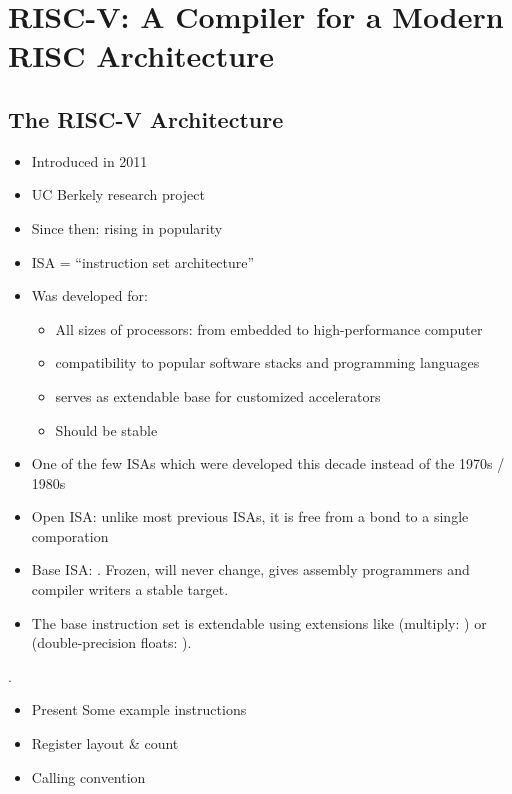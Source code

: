\section{RISC-V: A Compiler for a Modern RISC Architecture}
\subsection{The RISC-V Architecture}

\begin{itemize}
	\item Introduced in 2011
	\item UC Berkely research project
	\item Since then: rising in popularity
	\item ISA = \enquote{instruction set architecture}
	\item Was developed for:
	      \begin{itemize}
		      \item All sizes of processors: from embedded to high-performance computer
		      \item compatibility to popular software stacks and programming languages
		      \item serves as extendable base for customized accelerators
		      \item Should be stable
	      \end{itemize}
	\item One of the few ISAs which were developed this decade instead of the 1970s / 1980s
	\item Open ISA: unlike most previous ISAs, it is free from a bond to a single comporation
    \item Base ISA: .
        Frozen, will never change, gives assembly programmers and compiler writers a stable target.
    \item The base instruction set is extendable using extensions like (multiply: ) or (double-precision floats: ).
\end{itemize} \cite[Chapter~1]{Patterson2017}.


\begin{itemize}
	\item Present Some example instructions
	\item Register layout \& count
	\item Calling convention
\end{itemize}
